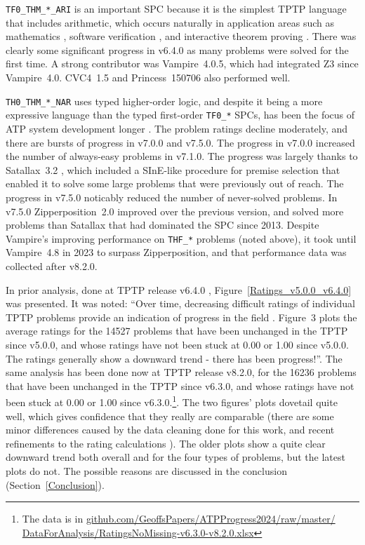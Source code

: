 \documentclass[runningheads]{llncs}
\begin{document}
{\tt TF0\_THM\_*\_ARI} is an important SPC because it is the simplest TPTP language that 
includes arithmetic, which occurs naturally in application areas such as mathematics \cite{KK+23}, 
software verification \cite{BF+15}, and interactive theorem proving \cite{PB10}.
There was clearly some significant progress in v6.4.0 as many problems were solved for the
first time.
A strong contributor was Vampire~4.0.5, which had integrated Z3 \cite{dMB08} since Vampire~4.0.
CVC4~1.5 \cite{BC+11} and Princess~150706 \cite{Rue08} also performed well.

{\tt TH0\_THM\_*\_NAR} uses typed higher-order logic, and despite it being a more expressive
language than the typed first-order {\tt TF0\_*} SPCs, has been the focus of ATP system development
longer \cite{SB10,SS+12}.
The problem ratings decline moderately, and there are bursts of progress in v7.0.0 and v7.5.0.
The progress in v7.0.0 increased the number of always-easy problems in v7.1.0.
The progress was largely thanks to Satallax~3.2 \cite{Bro12}, which included a SInE-like 
\cite{HV11} procedure for premise selection that enabled it to solve some large problems that 
were previously out of reach. 
The progress in v7.5.0 noticably reduced the number of never-solved problems.
In v7.5.0 Zipperposition~2.0 \cite{BB+19-CADE} improved over the previous version, and solved
more problems than Satallax that had dominated the SPC since 2013.
Despite Vampire's improving performance on {\tt THF\_*} problems (noted above), it took until
Vampire~4.8 in 2023 to surpass Zipperposition, and that performance data was collected after v8.2.0.

In prior analysis, done at TPTP release v6.4.0 \cite{Sut17}, Figure~\ref{Ratings_v5.0.0_v6.4.0} 
was presented. 
It was noted: ``Over time, decreasing difficult ratings of individual TPTP problems provide an 
indication of progress in the field \cite{SFS01}. Figure~3 plots the average ratings for the 
14527 problems that have been unchanged in the TPTP since v5.0.0, and whose ratings have not 
been stuck at 0.00 or 1.00 since v5.0.0. The ratings generally show a downward trend - there 
has been progress!''.
The same analysis has been done now at TPTP release v8.2.0, for the 16236 problems that have been 
unchanged in the TPTP since v6.3.0, and whose ratings have not been stuck at 0.00 or 1.00 since 
v6.3.0.\footnote{%
The data is in \href{https://github.com/GeoffsPapers/ATPProgress2024/raw/master/DataForAnalysis/RatingsNoMissing-v6.3.0-v8.2.0.xlsx}{github.com/GeoffsPapers/ATPProgress2024/raw/master/} 
\href{https://github.com/GeoffsPapers/ATPProgress2024/raw/master/DataForAnalysis/RatingsNoMissing-v6.3.0-v8.2.0.xlsx}{DataForAnalysis/RatingsNoMissing-v6.3.0-v8.2.0.xlsx}}.
The two figures' plots dovetail quite well, which gives confidence that they really are comparable
(there are some minor differences caused by the data cleaning done for this work, and recent 
refinements to the rating calculations \cite{SD23-CASC,SD24-CASC}).
The older plots show a quite clear downward trend both overall and for the four types of problems,
but the latest plots do not.
The possible reasons are discussed in the conclusion (Section~\ref{Conclusion}).
\end{document}
